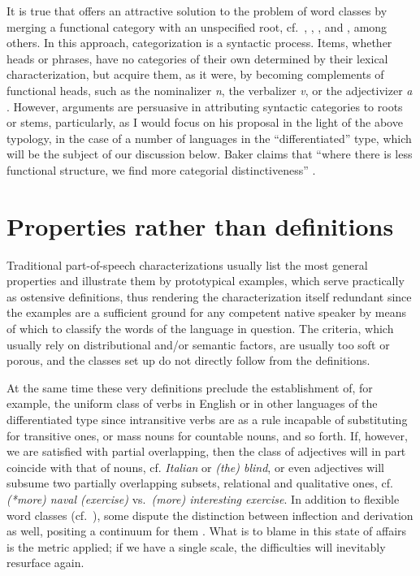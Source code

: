 \documentclass[output=paper]{langsci/langscibook}
\begin{document}
It is true that  offers an attractive solution to
the problem of word classes by merging a functional category with an
unspecified root, cf.\ \citet{HalleMarantz1993}, \citet{Marantz1997},
\citet{Arad2003}, and \citet{Panagiotidis2015}, among others. In this approach,
categorization is a syntactic process. Items, whether
heads or phrases, have no categories of their own determined by their lexical
characterization, but acquire them, as it were, by becoming complements of
functional heads, such as the nominalizer \emph{n}, the verbalizer \emph{v}, or
the adjectivizer \emph{a} \parencite[17]{Panagiotidis2015}. However,
 arguments are persuasive in attributing syntactic
categories to roots or stems, particularly, as I would
focus on his proposal in the light of the above typology, in the case of a
number of languages in the \enquote{differentiated} type, which will be the
subject of our discussion below. Baker claims that “where there is less
functional structure, we find more categorial distinctiveness”
\parencite[268]{Baker2003}.

\section{Properties rather than definitions}\label{sec:27.2}

Traditional part-of-speech characterizations usually list the most general
properties and illustrate them by prototypical examples, which serve
practically as ostensive definitions, thus rendering the characterization
itself redundant since the examples are a sufficient ground for any competent
native speaker by means of which to classify the words of the language in
question. The criteria, which usually rely on distributional and/or semantic
factors, are usually too soft or porous, and the classes set up do not directly
follow from the definitions.

At the same time these very definitions preclude the establishment of, for
example, the uniform class of verbs in English or in other languages of the
differentiated type since intransitive verbs are as a rule incapable of
substituting for transitive ones, or mass nouns for countable nouns, and so
forth. If, however, we are satisfied with partial overlapping, then the class
of adjectives will in part coincide with that of nouns, cf. \emph{Italian} or
\emph{(the) blind}, or even adjectives will subsume two partially overlapping
subsets, relational and qualitative ones, cf. \emph{(*more) naval (exercise)}
vs.\ \emph{(more) interesting exercise}. In addition to flexible word classes
(cf.\ \citealt{RijkhoffvanLier2013}), some dispute the distinction between
inflection and derivation as well, positing a continuum for them
\citep{Dressler1989}. What is to blame in this state of affairs is the metric
applied; if we have a single scale, the difficulties will inevitably resurface
again.
\end{document}
